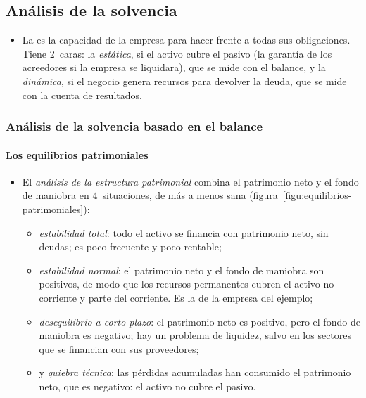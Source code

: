 \documentclass[11pt]{article}
\begin{document}
\subsection{Análisis de la solvencia}\label{sec:solvencia}

\begin{itemize}
\item La  es la capacidad de la empresa para hacer frente a todas sus obligaciones. Tiene 2~caras: la \emph{estática}, si el activo cubre el pasivo (la garantía de los acreedores si la empresa se liquidara), que se mide con el balance, y la \emph{dinámica}, si el negocio genera recursos para devolver la deuda, que se mide con la cuenta de resultados.
\end{itemize}

\subsubsection{Análisis de la solvencia basado en el balance}\label{sec:solvencia-balance}

\paragraph{Los equilibrios patrimoniales}

\begin{itemize}
\item El \emph{análisis de la estructura patrimonial} combina el patrimonio neto y el fondo de maniobra en 4~situaciones, de más a menos sana (figura~\ref{figu:equilibrios-patrimoniales}):
  \begin{itemize}
  \item \emph{estabilidad total}: todo el activo se financia con patrimonio neto, sin deudas; es poco frecuente y poco rentable;
  \item \emph{estabilidad normal}: el patrimonio neto y el fondo de maniobra son positivos, de modo que los recursos permanentes cubren el activo no corriente y parte del corriente. Es la de la empresa del ejemplo;
  \item \emph{desequilibrio a corto plazo}: el patrimonio neto es positivo, pero el fondo de maniobra es negativo; hay un problema de liquidez, salvo en los sectores que se financian con sus proveedores;
  \item y \emph{quiebra técnica}: las pérdidas acumuladas han consumido el patrimonio neto, que es negativo: el activo no cubre el pasivo.
  \end{itemize}
\end{itemize}
\end{document}
